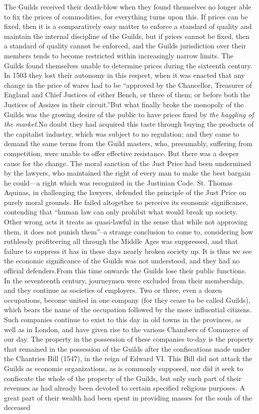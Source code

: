 \documentclass{book}
\begin{document}
The Guilds received their death-blow when they found themselves no longer able to fix the prices of commodities, for everything turns upon this. If prices can be fixed, then it is a comparatively easy matter to enforce a standard of quality and maintain the internal discipline of the Guilds, but if prices cannot be fixed, then a standard of quality cannot be enforced, and the Guilds jurisdiction over their members tends to become restricted within increasingly narrow limits. The Guilds found themselves unable to determine prices during the sixteenth century. In 1503 they lost their autonomy in this respect, when it was enacted that any change in the price of wares had to be “approved by the Chancellor, Treasurer of England and Chief Justices of either Bench, or three of them; or before both the Justices of Assizes in their circuit.”\footnotemark[2] But what finally broke the monopoly of the Guilds was the growing desire of the public to have prices fixed by \emph{the haggling of the market}.\footnotemark[3] No doubt they had acquired this taste through buying the products of the capitalist industry, which was subject to no regulation; and they came to demand the same terms from the Guild masters, who, presumably, suffering from competition, were unable to offer effective resistance. But there was a deeper cause for the change. The moral sanction of the Just Price had been undermined by the lawyers, who maintained the right of every man to make the best bargain he could—a right which was recognized in the Justinian Code. St. Thomas Aquinas, in challenging the lawyers, defended the principle of the Just Price on purely moral grounds. He failed altogether to perceive its economic significance, contending that “human law can only prohibit what would break up society. Other wrong acts it treats as quasi-lawful in the sense that while not approving them, it does not punish them”–a strange conclusion to come to, considering how ruthlessly profiteering all through the Middle Ages was suppressed, and that failure to suppress it has in these days nearly broken society up. It is thus we see the economic significance of the Guilds was not understood, and they had no official defenders.\footnotemark[4] From this time onwards the Guilds lose their public functions. In the seventeenth century, journeymen were excluded from their membership, and they continue as societies of employers. Two or three, even a dozen occupations, become united in one company (for they cease to be called Guilds), which bears the name of the occupation followed by the more influential citizens. Such companies continue to exist to this day in old towns in the provinces, as well as in London, and have given rise to the various Chambers of Commerce of our day. The property in the possession of these companies to-day is the property that remained in the possession of the Guilds after the confiscations made under the Chantries Bill (1547), in the reign of Edward VI. This Bill did not attack the Guilds as economic organizations, as is commonly supposed, nor did it seek to confiscate the whole of the property of the Guilds, but only such part of their revenues as had already been devoted to certain specified religious purposes. A great part of their wealth had been spent in providing masses for the souls of the deceased 
\end{document}
